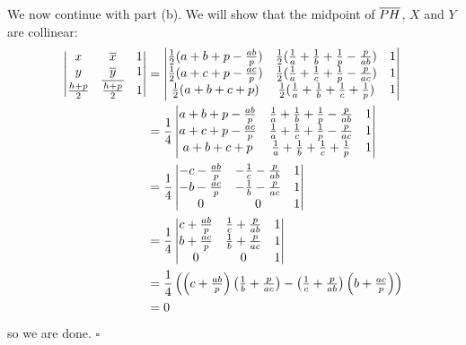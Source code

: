 \documentclass{article}
\begin{document}
We now continue with part (b). We will show that the midpoint of $\overline{PH}$, $X$ and $Y$ are collinear:
\begin{align*}
\begin{vmatrix}x&\overline{x}&1\\y&\overline{y}&1\\\tfrac{h+p}{2}&\overline{\tfrac{h+p}{2}}&1\\\end{vmatrix} &= \begin{vmatrix}\tfrac{1}{2}(a+b+p-\tfrac{ab}{p})&\tfrac{1}{2}(\tfrac{1}{a}+\tfrac{1}{b}+\tfrac{1}{p}-\tfrac{p}{ab})&1\\\tfrac{1}{2}(a+c+p-\tfrac{ac}{p})&\tfrac{1}{2}(\tfrac{1}{a}+\tfrac{1}{c}+\tfrac{1}{p}-\tfrac{p}{ac})&1\\\tfrac{1}{2}(a+b+c+p)&\tfrac{1}{2}(\tfrac{1}{a}+\tfrac{1}{b}+\tfrac{1}{c}+\tfrac{1}{p})&1\\\end{vmatrix} \\
&= \dfrac{1}{4}\begin{vmatrix}a+b+p-\tfrac{ab}{p}&\tfrac{1}{a}+\tfrac{1}{b}+\tfrac{1}{p}-\tfrac{p}{ab}&1\\a+c+p-\tfrac{ac}{p}&\tfrac{1}{a}+\tfrac{1}{c}+\tfrac{1}{p}-\tfrac{p}{ac}&1\\a+b+c+p&\tfrac{1}{a}+\tfrac{1}{b}+\tfrac{1}{c}+\tfrac{1}{p}&1\\\end{vmatrix} \\
&= \dfrac{1}{4}\begin{vmatrix}-c-\tfrac{ab}{p}&-\tfrac{1}{c}-\tfrac{p}{ab}&1\\-b-\tfrac{ac}{p}&-\tfrac{1}{b}-\tfrac{p}{ac}&1\\0&0&1\\\end{vmatrix} \\
&= \dfrac{1}{4}\begin{vmatrix}c+\tfrac{ab}{p}&\tfrac{1}{c}+\tfrac{p}{ab}&1\\b+\tfrac{ac}{p}&\tfrac{1}{b}+\tfrac{p}{ac}&1\\0&0&1\\\end{vmatrix} \\
&= \dfrac{1}{4}\left(\left(c+\tfrac{ab}{p}\right)\left(\tfrac{1}{b}+\tfrac{p}{ac}\right)-\left(\tfrac{1}{c}+\tfrac{p}{ab}\right)\left(b+\tfrac{ac}{p}\right)\right) \\
&= 0
\end{align*}
so we are done. $\square$
\end{document}
